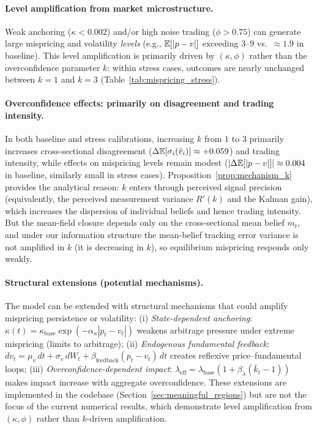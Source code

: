 \begin{proposition}
\begin{enumerate}[label=(\roman*)]
\end{enumerate}
\end{proposition}

\paragraph{Level amplification from market microstructure.}
Weak anchoring ($\kappa < 0.002$) and/or high noise trading ($\phi > 0.75$) can generate large mispricing and volatility \emph{levels} (e.g., $\mathbb{E}[|p-v|]$ exceeding $3$--$9$ vs.\ $\approx 1.9$ in baseline). This level amplification is primarily driven by $(\kappa,\phi)$ rather than the overconfidence parameter $k$: within stress cases, outcomes are nearly unchanged between $k=1$ and $k=3$ (Table~\ref{tab:mispricing_stress}).

\paragraph{Overconfidence effects: primarily on disagreement and trading intensity.}
In both baseline and stress calibrations, increasing $k$ from $1$ to $3$ primarily increases cross-sectional disagreement ($\Delta \mathbb{E}[\sigma_i(\hat v_i)] \approx +0.059$) and trading intensity, while effects on mispricing levels remain modest ($|\Delta \mathbb{E}[|p-v|]| \approx 0.004$ in baseline, similarly small in stress cases).
Proposition~\ref{prop:mechanism_k} provides the analytical reason: $k$ enters through perceived signal precision (equivalently, the perceived measurement variance $R'(k)$ and the Kalman gain), which increases the dispersion of individual beliefs and hence trading intensity.
But the mean-field closure depends only on the cross-sectional mean belief $m_t$, and under our information structure the mean-belief tracking error variance is not amplified in $k$ (it is decreasing in $k$), so equilibrium mispricing responds only weakly.

\paragraph{Structural extensions (potential mechanisms).}
The model can be extended with structural mechanisms that could amplify mispricing persistence or volatility:
(i) \emph{State-dependent anchoring}: $\kappa(t) = \kappa_{\text{base}} \exp(-\alpha_\kappa |p_t - v_t|)$ weakens arbitrage pressure under extreme mispricing (limits to arbitrage);
(ii) \emph{Endogenous fundamental feedback}: $dv_t = \mu_v\,dt + \sigma_v\,dW_t + \beta_{\text{feedback}} (p_t - v_t)\,dt$ creates reflexive price--fundamental loops;
(iii) \emph{Overconfidence-dependent impact}: $\lambda_{\text{eff}} = \lambda_{\text{base}} (1 + \beta_\lambda (\bar k_t - 1))$ makes impact increase with aggregate overconfidence.
These extensions are implemented in the codebase (Section~\ref{sec:meaningful_regions}) but are not the focus of the current numerical results, which demonstrate level amplification from $(\kappa,\phi)$ rather than $k$-driven amplification.

